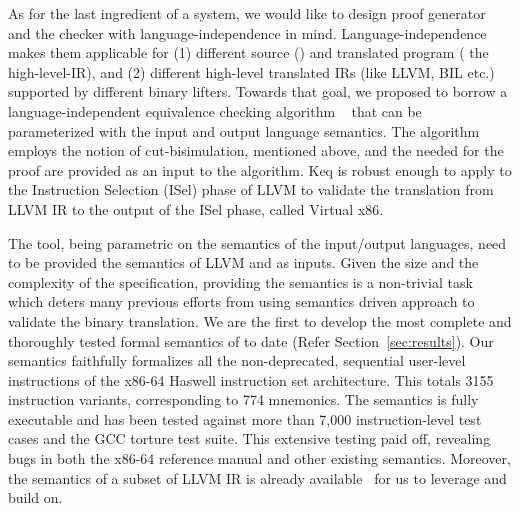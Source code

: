 As for the last ingredient of a \TV system, we would like to design proof
generator and the checker with language-independence in mind.
Language-independence makes them applicable for (1) different source (\ISA) and
translated program ( the high-level-IR), and (2) different high-level translated
IRs (like LLVM, BIL etc.) supported by different binary lifters.  Towards that
goal, we proposed to borrow a language-independent equivalence checking
algorithm ~\cite{TheoSAS19} that can be parameterized with the input and output
language semantics. The algorithm employs the notion of cut-bisimulation,
         mentioned above, and the \syncp  needed for the proof are
         provided  as an input to the algorithm. Keq is robust enough to apply to the Instruction Selection (ISel) phase of LLVM to validate the translation from LLVM IR to the output of the ISel phase, called Virtual x86. 
  
 The  tool, being parametric on the semantics of the input/output languages, need to be provided the semantics of LLVM and \ISA as inputs. Given the size and the complexity of the \ISA specification, providing the \ISA semantics is a non-trivial task which deters many previous efforts from using semantics driven approach to validate the binary translation. We are the first to develop 
 the most complete and thoroughly tested formal
 semantics of \ISA to date (Refer Section~\ref{sec:results}). Our semantics faithfully formalizes all the non-deprecated, sequential user-level instructions
 of the x86-64 Haswell instruction set architecture. This totals
 3155 instruction variants, corresponding to 774 mnemonics.
 The semantics is fully executable and has been tested against
 more than 7,000 instruction-level test cases and the GCC
 torture test suite. This extensive testing paid off, revealing
 bugs in both the x86-64 reference manual and other existing
 semantics.  Moreover, the semantics of a subset of
 LLVM IR is already available~\cite{LLVMSEMA} for us to leverage and build on.
%
